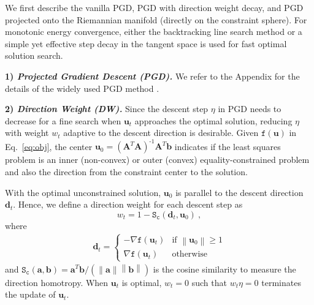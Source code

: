 \documentclass{article}
\newcommand{\mb}[1]{\mathbf{#1}}
\newcommand{\inv}{^{\text{-}1}}
\newcommand\norm[1]{\left\lVert#1\right\rVert}
\theoremstyle{plain}
\theoremstyle{definition}
\theoremstyle{remark}
\begin{document}
We first describe the vanilla PGD, PGD with direction weight decay, and PGD projected onto the Riemannian manifold (directly on the constraint sphere).
For monotonic energy convergence, either the backtracking line search method or a simple yet effective step decay in the tangent space is used for fast optimal solution search.

\textbf{1) \textit{Projected Gradient Descent (PGD).}}
We refer to the Appendix for the details of the widely used PGD method \cite{pgd_1,pgd_2}.

\textbf{2) \textit{Direction Weight (DW).}}
Since the descent step $\eta$ in PGD needs to decrease for a fine search when $\mb{u}_t$ approaches the optimal solution, reducing $\eta$ with weight $w_t$ adaptive to the descent direction is desirable.
%
Given $\texttt{f}(\mb{u})$ in Eq.~\eqref{eq:obj}, the center $\mb{u}_0=(\mb{A}^T\mb{A})\inv\mb{A}^T\mb{b}$ indicates if the least squares problem is an inner (non-convex) or outer (convex) equality-constrained problem and also the direction from the constraint center to the solution.

With the optimal unconstrained solution, $\mb{u}_0$ is parallel to the descent direction $\mb{d}_t$.
Hence, we define a direction weight for each descent step as
%
\begin{equation}
\label{eq:dir_weight}
w_t = 1 - \texttt{S}_\texttt{c}(\mb{d}_t, \mb{u}_0)\ ,
\end{equation}
%
where
%
\begin{equation}
\label{eq:dir_weight_dir}
\begin{aligned}
\mb{d}_t=
\begin{cases}
    -\nabla \texttt{f}(\mb{u}_t) & \text{if $\norm{ \mb{u}_0 } \geq 1$} \\
     \nabla \texttt{f}(\mb{u}_t) & \text{otherwise}
\end{cases}
\end{aligned}
\end{equation}
and $\texttt{S}_\texttt{c}(\mb{a},\mb{b})=\mb{a}^T \mb{b}/\left(\norm{ \mb{a} } \norm{ \mb{b} }\right)$ is the cosine similarity to measure the direction homotropy.
When $\mb{u}_t$ is optimal, $w_t=0$ such that $w_t \eta=0$ terminates the update of $\mb{u}_t$.
\end{document}
